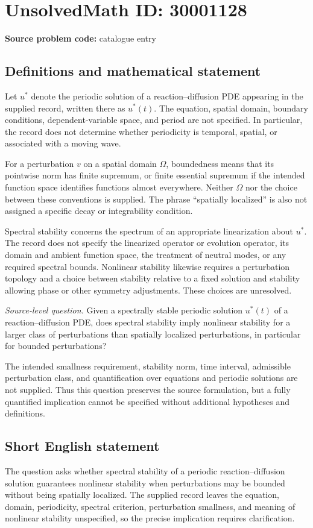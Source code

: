 \documentclass[11pt]{article}
\begin{document}
\section*{UnsolvedMath ID: 30001128}
\textbf{Source problem code:} catalogue entry
\subsection{Definitions and mathematical statement}
Let \(u^*\) denote the periodic solution of a reaction--diffusion PDE appearing in the supplied record, written there as \(u^*(t)\). The equation, spatial domain, boundary conditions, dependent-variable space, and period are not specified. In particular, the record does not determine whether periodicity is temporal, spatial, or associated with a moving wave.

For a perturbation \(v\) on a spatial domain \(\Omega\), boundedness means that its pointwise norm has finite supremum, or finite essential supremum if the intended function space identifies functions almost everywhere. Neither \(\Omega\) nor the choice between these conventions is supplied. The phrase ``spatially localized'' is also not assigned a specific decay or integrability condition.

Spectral stability concerns the spectrum of an appropriate linearization about \(u^*\). The record does not specify the linearized operator or evolution operator, its domain and ambient function space, the treatment of neutral modes, or any required spectral bounds. Nonlinear stability likewise requires a perturbation topology and a choice between stability relative to a fixed solution and stability allowing phase or other symmetry adjustments. These choices are unresolved.

\emph{Source-level question.} Given a spectrally stable periodic solution \(u^*(t)\) of a reaction--diffusion PDE, does spectral stability imply nonlinear stability for a larger class of perturbations than spatially localized perturbations, in particular for bounded perturbations?

The intended smallness requirement, stability norm, time interval, admissible perturbation class, and quantification over equations and periodic solutions are not supplied. Thus this question preserves the source formulation, but a fully quantified implication cannot be specified without additional hypotheses and definitions.
\subsection{Short English statement}
The question asks whether spectral stability of a periodic reaction--diffusion solution guarantees nonlinear stability when perturbations may be bounded without being spatially localized. The supplied record leaves the equation, domain, periodicity, spectral criterion, perturbation smallness, and meaning of nonlinear stability unspecified, so the precise implication requires clarification.
\end{document}

